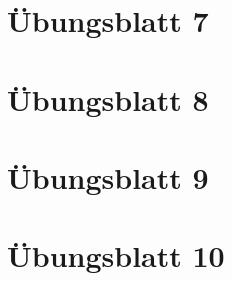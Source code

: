 \documentclass[11pt]{article}
\begin{document}
\section{Übungsblatt 7}


\section{Übungsblatt 8}



\section{Übungsblatt 9}


\section{Übungsblatt 10}

    
\end{document}
